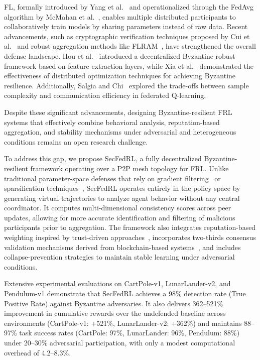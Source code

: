\documentclass[12pt,a4paper]{article}
\begin{document}
FL, formally introduced by Yang et al.~\cite{ref24} and operationalized through the
FedAvg algorithm by McMahan et al.~\cite{ref25}, enables multiple distributed
participants to collaboratively train models by sharing parameters instead of raw data.
Recent advancements, such as cryptographic verification techniques proposed by Cui
et al.~\cite{ref26} and robust aggregation methods like FLRAM~\cite{ref27}, have
strengthened the overall defense landscape. Hou et al.~\cite{ref28} introduced a
decentralized Byzantine-robust framework based on feature extraction layers, while Xia
et al.~\cite{ref29} demonstrated the effectiveness of distributed optimization
techniques for achieving Byzantine resilience. Additionally, Salgia and
Chi~\cite{ref30} explored the trade-offs between sample complexity and communication
efficiency in federated Q-learning.

Despite these significant advancements, designing Byzantine-resilient FRL systems that
effectively combine behavioral analysis, reputation-based aggregation, and stability
mechanisms under adversarial and heterogeneous conditions remains an open research
challenge.

To address this gap, we propose SecFedRL, a fully decentralized Byzantine-resilient
framework operating over a P2P mesh topology for FRL. Unlike traditional
parameter-space defenses that rely on gradient
filtering~\cite{ref19,ref20,ref21,ref22,ref27} or sparsification
techniques~\cite{ref10}, SecFedRL operates entirely in the policy space by generating
virtual trajectories to analyze agent behavior without any central coordinator. It
computes multi-dimensional consistency scores across peer updates, allowing for more
accurate identification and filtering of malicious participants prior to aggregation.
The framework also integrates reputation-based weighting inspired by trust-driven
approaches~\cite{ref1,ref14,ref18}, incorporates two-thirds consensus validation
mechanisms derived from blockchain-based systems~\cite{ref6,ref26}, and includes
collapse-prevention strategies to maintain stable learning under adversarial conditions.

Extensive experimental evaluations on CartPole-v1, LunarLander-v2, and Pendulum-v1
demonstrate that SecFedRL achieves a 98\% detection rate (True Positive Rate) against
Byzantine adversaries. It also delivers 362--521\% improvement in cumulative rewards
over the undefended baseline across environments (CartPole-v1: +521\%,
LunarLander-v2: +362\%) and maintains 88--97\% task success rates (CartPole: 97\%,
LunarLander: 96\%, Pendulum: 88\%) under 20--30\% adversarial participation, with only
a modest computational overhead of 4.2--8.3\%.
\end{document}
